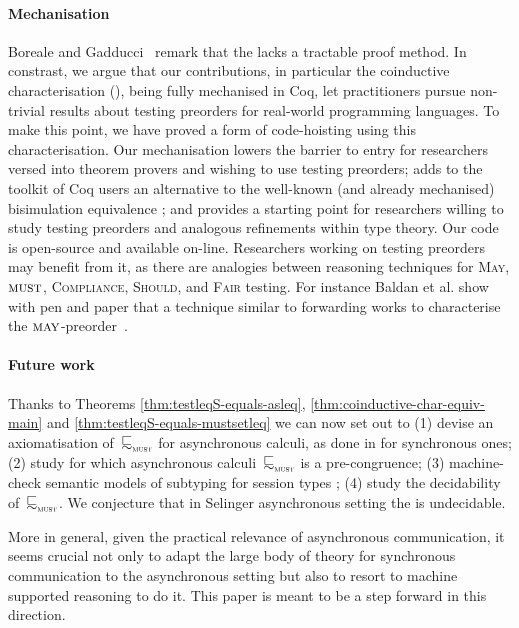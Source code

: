 \paragraph{Mechanisation} %
Boreale and Gadducci~\cite{DBLP:journals/tcs/BorealeG06} remark that the
\mustpreorder lacks a tractable proof method.  In constrast, we argue that our
contributions, in particular the coinductive characterisation
(), being fully mechanised in Coq, let
practitioners pursue non-trivial results about testing preorders for real-world
programming languages.  
%
To make this point, we have proved a form of code-hoisting using this
characterisation.
%
Our mechanisation lowers the barrier to entry for
researchers versed into theorem provers and wishing to use testing preorders;
adds to the toolkit of Coq users an alternative to the well-known (and already
mechanised) bisimulation equivalence \cite{DBLP:conf/lics/Pous16}; and provides
a starting point for researchers willing to study testing preorders and
analogous refinements within type theory.  Our code is open-source and available
on-line. %
Researchers working on testing preorders may benefit from it, as
there are analogies between reasoning techniques for \textsc{May}, $\operatorname{\textsc{must}}$,
\textsc{Compliance}, \textsc{Should}, and \textsc{Fair} testing. For instance
Baldan et al. show with pen and paper that a technique similar to forwarding
works to characterise the $\May$-preorder~\cite{DBLP:conf/birthday/BaldanBGV15}.
%  

\paragraph{Future work}  Thanks to Theorems \ref{thm:testleqS-equals-asleq},
\ref{thm:coinductive-char-equiv-main} and \ref{thm:testleqS-equals-mustsetleq}
we can now set out to (1) devise an
axiomatisation of~$\testleqS$ for asynchronous calculi, as done in
\cite{DBLP:journals/fac/HennessyI93,DBLP:journals/iandc/BorealeN95,DBLP:books/daglib/0066919,DBLP:journals/tcs/Hennessy02}
for synchronous ones; (2) study for which asynchronous calculi~$\testleqS$ is a
pre-congruence; (3) machine-check semantic models of subtyping for session types
\cite{DBLP:journals/mscs/BernardiH16}; (4) study the decidability
of~$\testleqS$.  We conjecture that in Selinger asynchronous setting the
\mustpreorder is undecidable.

More in general, given the practical relevance of asynchronous
communication, it seems crucial %
not only to adapt the large body of theory for synchronous
communication to the asynchronous setting but also to resort to
machine supported reasoning to do it. This paper is meant to be a step
forward in this direction.


